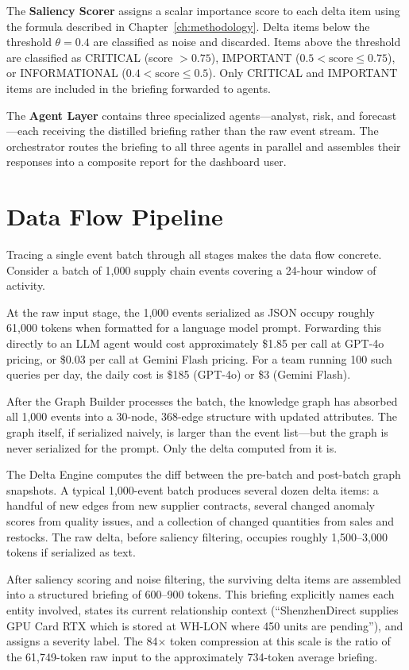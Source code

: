 The \textbf{Saliency Scorer} assigns a scalar importance score to each delta item using
the formula described in Chapter~\ref{ch:methodology}. Delta items below the threshold
$\theta = 0.4$ are classified as noise and discarded. Items above the threshold are
classified as CRITICAL (score $> 0.75$), IMPORTANT ($0.5 < \text{score} \leq 0.75$), or
INFORMATIONAL ($0.4 < \text{score} \leq 0.5$). Only CRITICAL and IMPORTANT items are
included in the briefing forwarded to agents.

The \textbf{Agent Layer} contains three specialized agents---analyst, risk, and forecast---each
receiving the distilled briefing rather than the raw event stream. The orchestrator routes
the briefing to all three agents in parallel and assembles their responses into a composite
report for the dashboard user.

\section{Data Flow Pipeline}
\label{sec:data_flow}

Tracing a single event batch through all stages makes the data flow concrete. Consider a
batch of 1,000 supply chain events covering a 24-hour window of activity.

At the raw input stage, the 1,000 events serialized as JSON occupy roughly 61,000 tokens
when formatted for a language model prompt. Forwarding this directly to an LLM agent would
cost approximately \$1.85 per call at GPT-4o pricing, or \$0.03 per call at Gemini Flash
pricing. For a team running 100 such queries per day, the daily cost is \$185 (GPT-4o) or
\$3 (Gemini Flash).

After the Graph Builder processes the batch, the knowledge graph has absorbed all 1,000
events into a 30-node, 368-edge structure with updated attributes. The graph itself, if
serialized naively, is larger than the event list---but the graph is never serialized for
the prompt. Only the delta computed from it is.

The Delta Engine computes the diff between the pre-batch and post-batch graph snapshots.
A typical 1,000-event batch produces several dozen delta items: a handful of new edges
from new supplier contracts, several changed anomaly scores from quality issues, and a
collection of changed quantities from sales and restocks. The raw delta, before saliency
filtering, occupies roughly 1,500--3,000 tokens if serialized as text.

After saliency scoring and noise filtering, the surviving delta items are assembled into a
structured briefing of 600--900 tokens. This briefing explicitly names each entity
involved, states its current relationship context (``ShenzhenDirect supplies GPU Card RTX
which is stored at WH-LON where 450 units are pending''), and assigns a severity label.
The 84$\times$ token compression at this scale is the ratio of the 61,749-token raw input
to the approximately 734-token average briefing.

